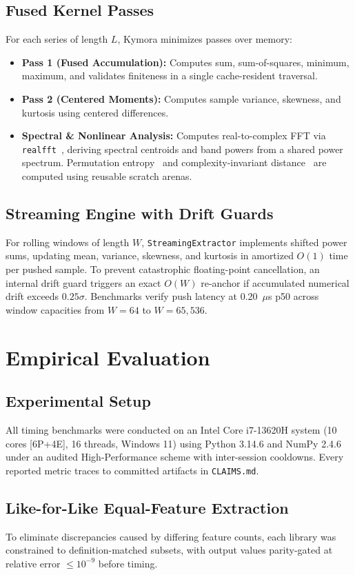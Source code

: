 \documentclass[10pt,twocolumn,letterpaper]{article}
\begin{document}
\subsection{Fused Kernel Passes}
For each series of length $L$, Kymora minimizes passes over memory:
\begin{itemize}
    \item \textbf{Pass 1 (Fused Accumulation):} Computes sum, sum-of-squares, minimum, maximum, and validates finiteness in a single cache-resident traversal.
    \item \textbf{Pass 2 (Centered Moments):} Computes sample variance, skewness, and kurtosis using centered differences.
    \item \textbf{Spectral & Nonlinear Analysis:} Computes real-to-complex FFT via \texttt{realfft}~\cite{frigo2005design}, deriving spectral centroids and band powers from a shared power spectrum. Permutation entropy~\cite{bandt2002permutation} and complexity-invariant distance~\cite{batista2014cid} are computed using reusable scratch arenas.
\end{itemize}

\subsection{Streaming Engine with Drift Guards}
For rolling windows of length $W$, \texttt{StreamingExtractor} implements shifted power sums, updating mean, variance, skewness, and kurtosis in amortized $O(1)$ time per pushed sample. To prevent catastrophic floating-point cancellation, an internal drift guard triggers an exact $O(W)$ re-anchor if accumulated numerical drift exceeds $0.25\sigma$. Benchmarks verify push latency at 0.20~$\mu$s p50 across window capacities from $W=64$ to $W=65,536$.

\section{Empirical Evaluation}
\subsection{Experimental Setup}
All timing benchmarks were conducted on an Intel Core i7-13620H system (10 cores [6P+4E], 16 threads, Windows 11) using Python 3.14.6 and NumPy 2.4.6 under an audited High-Performance scheme with inter-session cooldowns. Every reported metric traces to committed artifacts in \texttt{CLAIMS.md}.

\subsection{Like-for-Like Equal-Feature Extraction}
To eliminate discrepancies caused by differing feature counts, each library was constrained to definition-matched subsets, with output values parity-gated at relative error $\le 10^{-9}$ before timing.
\end{document}
